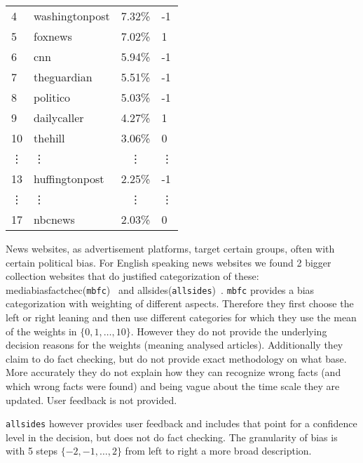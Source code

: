 \documentclass[runningheads,a4paper]{llncs}
\begin{document}
\begin{table}
\begin{subtable}{0.5\textwidth}
\begin{tabular}{l|l|c|l}
				\rowcolor{democratic}
				4 & washingtonpost &	7.32\% &	-1\\
				\rowcolor{republican}
				5 & foxnews	& 7.02\% &	1\\
				\rowcolor{democratic}
				6 & cnn &	5.94\% &	-1\\
				\rowcolor{democratic}
				7 & theguardian &	5.51\% &	-1\\
				\rowcolor{democratic}
				8 & politico &	5.03\% &	-1\\
				\rowcolor{republican}
				9 & dailycaller	 & 4.27\% &	1\\
				\rowcolor{neutral}
				10 & thehill	 & 3.06\% &	0\\
				\vdots & \vdots & \vdots & \vdots\\
				\rowcolor{democratic}
				13 & huffingtonpost &	2.25\% &	-1\\
				\vdots & \vdots & \vdots & \vdots\\
				\rowcolor{neutral}
				17 & nbcnews & 2.03\% & 0
			\end{tabular}%
		\end{subtable}%
	\end{table}%
	News websites, as advertisement platforms, target certain groups, often with certain political bias.
	For English speaking news websites we found 2 bigger collection websites that do justified categorization of these:\\
	mediabiasfactchec(\texttt{mbfc})~\cite{mbfc} and allsides(\texttt{allsides})~\cite{allsides}.
	\texttt{mbfc} provides a bias categorization with weighting of different aspects. Therefore they first choose the left or right leaning and then use different categories for which they use the mean of the weights in $\{0,1,\ldots,10\}$. However they do not provide the underlying decision reasons for the weights (meaning analysed articles).
	Additionally they claim to do fact checking, but do not provide exact methodology on what base. More accurately they do not explain how they can recognize wrong facts (and which wrong facts were found) and being vague about the time scale they are updated. User feedback is not provided.\par
	\texttt{allsides} however provides user feedback and includes that point for a confidence level in the decision, but does not do fact checking. The granularity of bias is with 5 steps $\{-2,-1,\ldots,2\}$ from left to right a more broad description.\par
\end{document}
